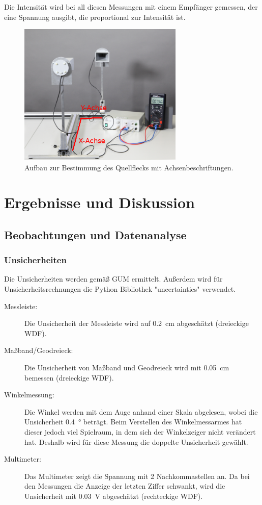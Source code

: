 \documentclass[
	a4paper,
	12pt,
	pagesize,
	ngerman
]{scrartcl}
\begin{document}
	Die Intensität wird bei all diesen Messungen mit einem Empfänger gemessen, der eine Spannung ausgibt, die proportional zur Intensität ist.
	
	\begin{figure}[H] 
		\includegraphics[width=0.7\textwidth]{MikrowellenMitAchsen}
		\centering
		\caption{Aufbau zur Bestimmung des Quellflecks mit Achsenbeschriftungen.\cite{Geometrie}}
		\label{fig_mikrowellenmitachsen}
		\centering
	\end{figure}
	
	\section{Ergebnisse und Diskussion}
	

	\subsection{Beobachtungen und Datenanalyse}
	\subsubsection{Unsicherheiten} %
	Die Unsicherheiten werden gemäß GUM ermittelt. 
	Außerdem wird für Unsicherheitsrechnungen die Python Bibliothek "uncertainties" verwendet.
	\begin{description}
		\item[Messleiste:] Die Unsicherheit der Messleiste wird auf \SI{0,2}{cm} abgeschätzt (dreieckige WDF).
		\item[Maßband/Geodreieck:] Die Unsicherheit von Maßband und Geodreieck wird mit \SI{0,05}{cm} bemessen (dreieckige WDF).
		\item[Winkelmessung:]  Die Winkel werden mit dem Auge anhand einer Skala abgelesen, wobei die Unsicherheit \SI{0,4}{\degree} beträgt. Beim Verstellen des Winkelmessarmes hat dieser jedoch viel Spielraum, in dem sich der Winkelzeiger nicht verändert hat. Deshalb wird für diese Messung die doppelte Unsicherheit gewählt.
		\item[Multimeter:] Das Multimeter zeigt die Spannung mit 2 Nachkommastellen an. Da bei den Messungen die Anzeige der letzten Ziffer schwankt, wird die Unsicherheit mit \SI{0,03}{V} abgeschätzt (rechteckige WDF).
	\end{description}
\end{document}
